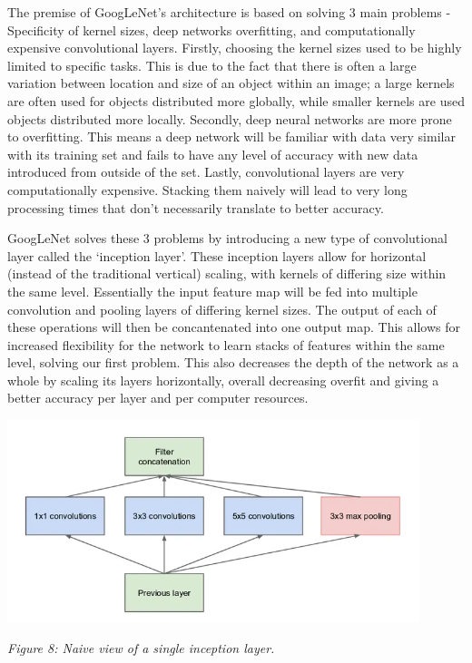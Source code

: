 \documentclass[11pt]{article}
\begin{document}
        The premise of GoogLeNet's architecture is based on solving 3 main problems - Specificity of kernel sizes, deep networks overfitting, and computationally expensive convolutional layers. Firstly, choosing the kernel sizes used to be highly limited to specific tasks. This is due to the fact that there is often a large variation between location and size of an object within an image; a large kernels are often used for objects distributed more globally, while smaller kernels are used objects distributed more locally. Secondly, deep neural networks are more prone to overfitting. This means a deep network will be familiar with data very similar with its training set and fails to have any level of accuracy with new data introduced from outside of the set. Lastly, convolutional layers are very computationally expensive. Stacking them naively will lead to very long processing times that don't necessarily translate to better accuracy.

        GoogLeNet solves these 3 problems by introducing a new type of convolutional layer called the `inception layer'. These inception layers allow for horizontal (instead of the traditional vertical) scaling, with kernels of differing size within the same level. Essentially the input feature map will be fed into multiple convolution and pooling layers of differing kernel sizes. The output of each of these operations will then be concantenated into one output map. This allows for increased flexibility for the network to learn stacks of features within the same level, solving our first problem. This also decreases the depth of the network as a whole by scaling its layers horizontally, overall decreasing overfit and giving a better accuracy per layer and per computer resources.

        \begin{center}
            \includegraphics[width=12cm]{images/inceptionlayer.png}
            \\
            \raggedright \textit{
            Figure 8: Naive view of a single inception layer.
            }
        \end{center}
\end{document}
